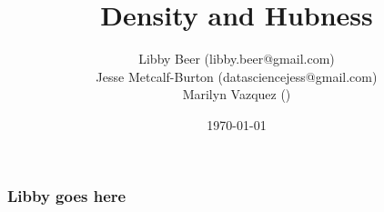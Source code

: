 \documentclass{beamer}
\title[Hubness]{Density and Hubness} %
\author{Libby Beer (libby.beer@gmail.com)\\
Jesse Metcalf-Burton (datasciencejess@gmail.com)\\
Marilyn Vazquez ()} %
\date{\today} %
\begin{document}
\begin{frame}
\titlepage %
\end{frame}







\begin{frame}
\frametitle{Libby goes here}

\end{frame}

\end{document}
